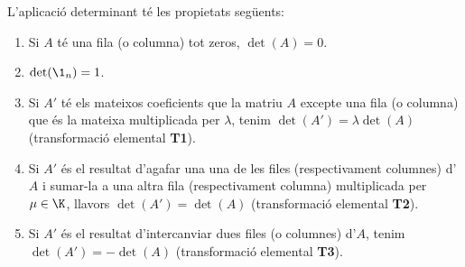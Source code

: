 \begin{proposicio}
	L'aplicació determinant té les propietats següents:
	\begin{enumerate}[\rm (a)]
		\item Si $A$ té una fila (o columna) tot zeros, $\det(A)=0$.
		\item $\det(\1_n)=1$.
		\item Si $A'$ té els mateixos coeficients que la matriu $A$ excepte una fila (o columna) que és la mateixa multiplicada per $\lambda$, tenim $\det(A')=\lambda \det(A)$ (transformació elemental \textbf{T1}).
		\item Si $A'$ és el resultat d'agafar una una de les files (respectivament columnes) d'$A$ i sumar-la a una altra fila (respectivament columna) multiplicada per $\mu \in \K$, llavors $\det(A')=\det(A)$ (transformació elemental \textbf{T2}).
		\item Si $A'$ és el resultat d'intercanviar dues files (o columnes) d'$A$, tenim $\det(A')=-\det(A)$ (transformació elemental \textbf{T3}).
	\end{enumerate}
\end{proposicio}
